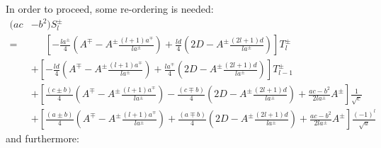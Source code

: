 In order to proceed, some re-ordering is needed:
\begin{align}
  (ac&-b^2) S^{\pm}_l \nonumber \\
  =& \phantom{+}~ \left[
                    - \frac{l a^{\pm}}{4} \left( A^{\mp} - A^{\pm} \frac{(l+1)a^{\mp}}{l a^{\pm}} \right)
                    + \frac{l d      }{4} \left( 2 D     - A^{\pm} \frac{(2l+1)d}{l a^{\pm}}      \right)
                  \right] T^{\pm}_l \nonumber \\
  ~&          +    \left[
                    - \frac{l d      }{4} \left( A^{\mp} - A^{\pm} \frac{(l+1)a^{\mp}}{l a^{\pm}} \right)
                    + \frac{l a^{\mp}}{4} \left( 2 D     - A^{\pm} \frac{(2l+1)d}{l a^{\pm}}      \right)
                  \right] T^{\pm}_{l-1} \nonumber \\
  ~&          +    \left[
                      \frac{(c \pm b)}{4} \left( A^{\mp} - A^{\pm} \frac{(l+1)a^{\mp}}{l a^{\pm}} \right)
                    - \frac{(c \mp b)}{4} \left( 2 D     - A^{\pm} \frac{(2l+1)d}{l a^{\pm}}      \right)
                    + \frac{ac-b^2}{2 l a^{\pm}} A^{\pm}
                  \right] \frac{1}{\sqrt{c}} \nonumber \\
  ~&          +    \left[
                      \frac{(a \pm b)}{4} \left( A^{\mp} - A^{\pm} \frac{(l+1)a^{\mp}}{l a^{\pm}} \right)
                    + \frac{(a \mp b)}{4} \left( 2 D     - A^{\pm} \frac{(2l+1)d}{l a^{\pm}}      \right)
                    + \frac{ac-b^2}{2 l a^{\pm}} A^{\pm}
                  \right] \frac{(-1)^l}{\sqrt{a}} \nonumber
\end{align}
and furthermore:
